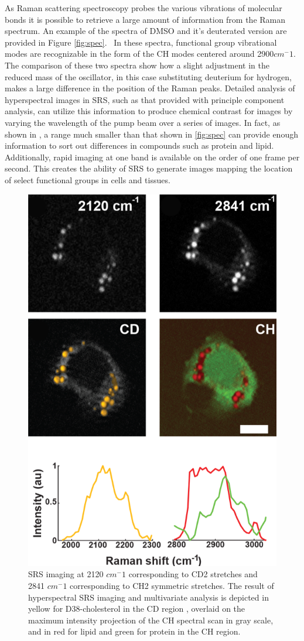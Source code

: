 As Raman scattering spectroscopy probes the various vibrations of molecular bonds it is possible to retrieve a large amount of information from the Raman spectrum. An example of the spectra of DMSO and it's deuterated version are provided in Figure \ref{fig:spec}.~\cite{C6RA25879D} In these spectra, functional group vibrational modes are recognizable in the form of the CH modes centered around 2900$cm^-1$. The comparison of these two spectra show how a slight adjustment in the reduced mass of the oscillator, in this case substituting deuterium for hydrogen, makes a large difference in the position of the Raman peaks.  Detailed analysis of hyperspectral images in SRS, such as that provided with principle component analysis, can utilize this information to produce chemical contrast for images by varying the wavelength of the pump beam over a series of images. In fact, as shown in \cite{Alfonso-Garcia2015}, a range much smaller than that shown in \ref{fig:spec} can provide enough information to sort out differences in compounds such as protein and lipid. Additionally, rapid imaging at one band is available on the order of one frame per second. This creates the ability of SRS to generate images mapping the location of select functional groups in cells and tissues. 

\begin{figure}[ht]
    \centering
    \includegraphics[width=0.5\linewidth]{Figures/dchol.png}
    \caption{SRS imaging at  2120 $cm^-1$ corresponding to CD2 stretches and 2841 $cm^-1$ corresponding to CH2 symmetric stretches. The result of hyperspectral SRS imaging and multivariate analysis is depicted in yellow for D38-cholesterol in the CD region , overlaid on the maximum intensity projection of the CH spectral scan in gray scale, and in red for lipid and green for protein in the CH region.}
    \label{fig:dchol}
\end{figure}

